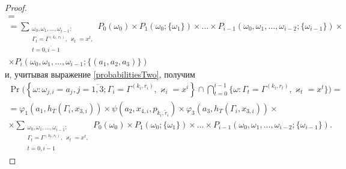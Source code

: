 \documentclass[a4paper,12pt,russian]{extarticle}
\begin{document}
\begin{proof}
\begin{multline*}
= \\ =\sum_{\substack{\omega_0, \omega_1,\ldots, \omega_{i-1} \colon \\ \Gamma_t=\Gamma^{(k_t,r_t)},\, \varkappa_t=x^t, \\ t=\overline{0,i-1}}} P_0(\omega_0)\times P_1(\omega_0;\{\omega_1\})\times\ldots \times P_{i-1}(\omega_0,\omega_1,\ldots, \omega_{i-2};\{\omega_{i-1}\})
\times \\[-2ex] \times P_i(\omega_0,\omega_1,\ldots, \omega_{i-1};\{(a_1, a_2, a_3)\})
\end{multline*}
и, учитывая выражение \eqref{probabilitiesTwo}, получим
\begin{multline}
\Pr\biggl( \left\{ \omega \colon \omega_{j,i} = a_j, j=\overline{1,3}; \Gamma_i=\Gamma^{(k_i,r_i)}, \varkappa_i=x^i\right\} \cap \bigcap_{t=0}^{i-1}\{\omega\colon \Gamma_t=\Gamma^{(k_t,r_t)}, \varkappa_t=x^t\}\biggr) 
=\\=\varphi_1(a_1,h_T(\Gamma_i,x_{3,i})) \times \psi(a_2,x_{4,i}, p_{\tilde{k}_i,\tilde{r}_i}) \times  \varphi_3(a_3,h_T(\Gamma_i,x_{3,i}))
\times \\ \times \sum_{\substack{\omega_0, \omega_1,\ldots, \omega_{i-1} \colon \\ \Gamma_t=\Gamma^{(k_t,r_t)},\, \varkappa_t=x^t,\\ t=\overline{0,i-1}}} P_0(\omega_0)\times P_1(\omega_0;\{\omega_1\})\times \ldots \times P_{i-1}(\omega_0,\omega_1,\ldots, \omega_{i-2};\{\omega_{i-1}\}).
\label{Construction:4}
\end{multline}


\end{proof}
\end{document}
